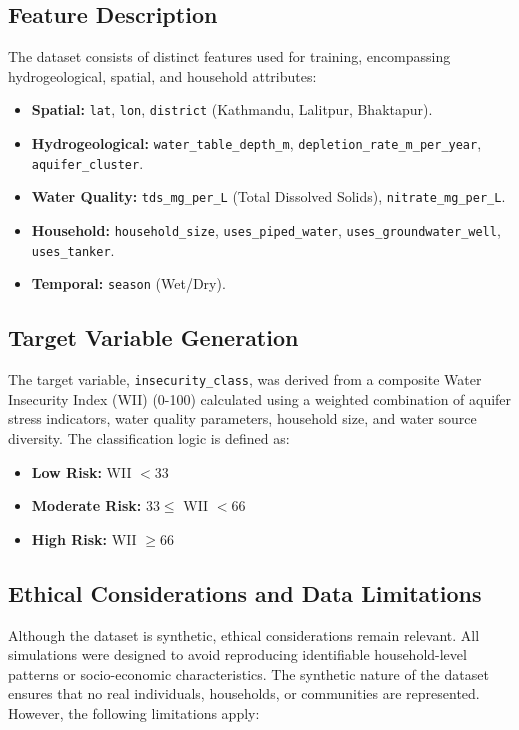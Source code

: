 \documentclass[conference]{IEEEtran}
\begin{document}
\subsection{Feature Description}
The dataset consists of distinct features used for training, encompassing hydrogeological, spatial, and household attributes:
\begin{itemize}
    \item \textbf{Spatial:} \texttt{lat}, \texttt{lon}, \texttt{district} (Kathmandu, Lalitpur, Bhaktapur).
    \item \textbf{Hydrogeological:} \texttt{water\_table\_depth\_m}, \texttt{depletion\_rate\_m\_per\_year}, \texttt{aquifer\_cluster}.
    \item \textbf{Water Quality:} \texttt{tds\_mg\_per\_L} (Total Dissolved Solids), \texttt{nitrate\_mg\_per\_L}.
    \item \textbf{Household:} \texttt{household\_size}, \texttt{uses\_piped\_water}, \texttt{uses\_groundwater\_well}, \texttt{uses\_tanker}.
    \item \textbf{Temporal:} \texttt{season} (Wet/Dry).
\end{itemize}

\subsection{Target Variable Generation}
The target variable, \texttt{insecurity\_class}, was derived from a composite Water Insecurity Index (WII) (0-100) calculated using a weighted combination of aquifer stress indicators, water quality parameters, household size, and water source diversity. The classification logic is defined as:
\begin{itemize}
    \item \textbf{Low Risk:} WII $< 33$
    \item \textbf{Moderate Risk:} $33 \leq$ WII $< 66$
    \item \textbf{High Risk:} WII $\geq 66$
\end{itemize}

\subsection{Ethical Considerations and Data Limitations}
Although the dataset is synthetic, ethical considerations remain relevant. All simulations were designed to avoid reproducing identifiable household-level patterns or socio-economic characteristics. The synthetic nature of the dataset ensures that no real individuals, households, or communities are represented. However, the following limitations apply:
\end{document}
